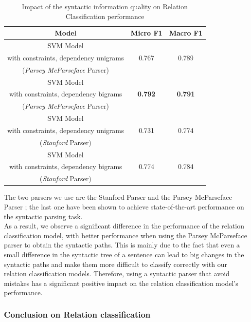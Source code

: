 \documentclass[12pt]{article}
\begin{document}
\begin{table}[!ht]
\center
\begin{tabular}{c||c|c}
	Model & Micro F1 & Macro F1 \\
	\hline
	\hline
	SVM Model & & \\
	with constraints, dependency unigrams & 0.767 & 0.789 \\
	(\textit{Parsey McParseface} Parser) & & \\ \hline
	SVM Model & & \\
	with constraints, dependency bigrams & \textbf{0.792} & \textbf{0.791} \\
	(\textit{Parsey McParseface} Parser) & & \\ \hline
	SVM Model & & \\
	with constraints, dependency unigrams & 0.731 & 0.774 \\
	(\textit{Stanford} Parser) & & \\ \hline
	SVM Model & & \\
	with constraints, dependency bigrams & 0.774 & 0.784 \\
	(\textit{Stanford} Parser) & & \\ \hline
\end{tabular}
\caption{\label{impactSyntaxRelationClassification} Impact of the syntactic information quality on Relation Classification performance}
\end{table}

The two parsers we use are the Stanford Parser \cite{chen2014fast} and the Parsey McParseface Parser \cite{andor2016globally}; the last one have been shown to achieve state-of-the-art performance on the syntactic parsing task.\\
As a result, we observe a significant difference in the performance of the relation classification model, with better performance when using the Parsey McParseface parser to obtain the syntactic paths. This is mainly due to the fact that even a small difference in the syntactic tree of a sentence can lead to big changes in the syntactic paths and make them more difficult to classify correctly with our relation classification models. Therefore, using a syntactic parser that avoid mistakes has a significant positive impact on the relation classification model's performance.

\subsubsection{Conclusion on Relation classification}
\end{document}
